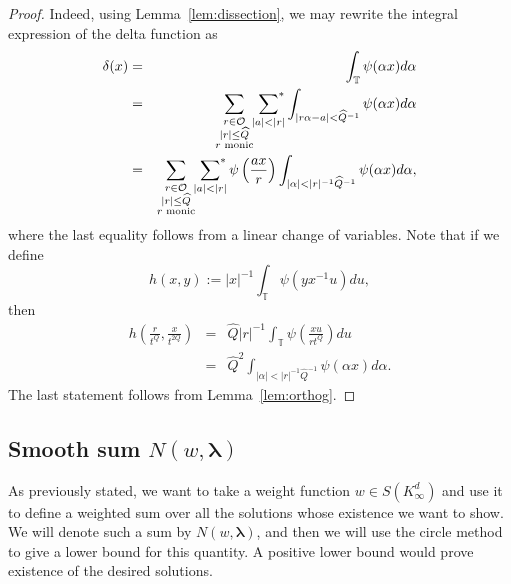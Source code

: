 \documentclass[10pt]{amsart}
\theoremstyle{plain}
\theoremstyle{plain}
\theoremstyle{remark}
\theoremstyle{definition}
\renewcommand{\hat}{\widehat}
\newcommand{\TT}{\mathbb{T}}
\newcommand{\sumstar}{\sideset{}{^*}\sum}
\newcommand{\cO}{\mathcal{O}}
\begin{document}
\begin{proof}
Indeed, using Lemma~\ref{lem:dissection}, we may rewrite the integral expression of the delta function as
\begin{eqnarray*}
\delta(x)&=&\int_{\TT}\psi(\alpha x)d\alpha\\
&=& \sum_{\substack{r\in \cO\\
|r|\leq \hat Q\\
\text{$r$ monic}
} }
\sumstar_{\substack{
|a|<|r|} }\int_{|r\alpha-a|<\hat Q^{-1}}\psi(\alpha x)d\alpha\\ &=& \sum_{\substack{r\in \cO\\
|r|\leq \hat Q\\
\text{$r$ monic}
} }
\sumstar_{\substack{
|a|<|r|} }\psi\left(\frac{ax}{r}\right)\int_{|\alpha|<|r|^{-1}\hat Q^{-1}}\psi(\alpha x)d\alpha,
\end{eqnarray*}
where the last equality follows from a linear change of variables. Note that if we define
\[
h(x,y):=|x|^{-1}\int_{\TT}\psi(y x^{-1} u) du,
\]
then
\begin{eqnarray*}
h\left(\frac{r}{t^Q},\frac{x}{t^{2Q}}\right)&=& \hat{Q}|r|^{-1}\int_{\TT}\psi\left(\frac{xu}{rt^Q}\right)du\\
&=&\hat{Q}^2\int_{|\alpha|<|r|^{-1}\hat{Q}^{-1}}\psi(\alpha x)d\alpha.
\end{eqnarray*}
The last statement follows from Lemma~\ref{lem:orthog}.
\end{proof}
\subsection{Smooth sum $N(w,\boldsymbol{\lambda})$}
As previously stated, we want to take a weight function $w\in S(K_{\infty}^d)$ and use it to define a weighted sum over all the solutions whose existence we want to show. We will denote such a sum by $N(w,\boldsymbol{\lambda})$, and then we will use the circle method to give a lower bound for this quantity. A positive lower bound would prove existence of the desired solutions.\\
\\
\end{document}
